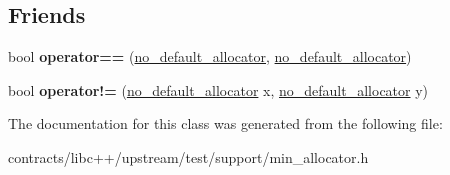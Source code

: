 \subsection*{Friends}
\begin{DoxyCompactItemize}
\item 
\mbox{\label{classno__default__allocator_af86015337f39c8081cb69154f76f5985}} 
bool {\bfseries operator==} (\mbox{\hyperlink{classno__default__allocator}{no\+\_\+default\+\_\+allocator}}, \mbox{\hyperlink{classno__default__allocator}{no\+\_\+default\+\_\+allocator}})
\item 
\mbox{\label{classno__default__allocator_a249864a7216f5da324502a3e16e2f783}} 
bool {\bfseries operator!=} (\mbox{\hyperlink{classno__default__allocator}{no\+\_\+default\+\_\+allocator}} x, \mbox{\hyperlink{classno__default__allocator}{no\+\_\+default\+\_\+allocator}} y)
\end{DoxyCompactItemize}


The documentation for this class was generated from the following file\+:\begin{DoxyCompactItemize}
\item 
contracts/libc++/upstream/test/support/min\+\_\+allocator.\+h\end{DoxyCompactItemize}
